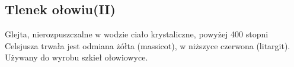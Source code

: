 \subsection{Tlenek ołowiu(II) }
Glejta, nierozpuszczalne w wodzie ciało krystaliczne, powyżej 400 stopni Celsjusza trwała jest odmiana żółta (massicot), w niższyce czerwona (litargit).
Używany do wyrobu szkieł ołowiowyce.

